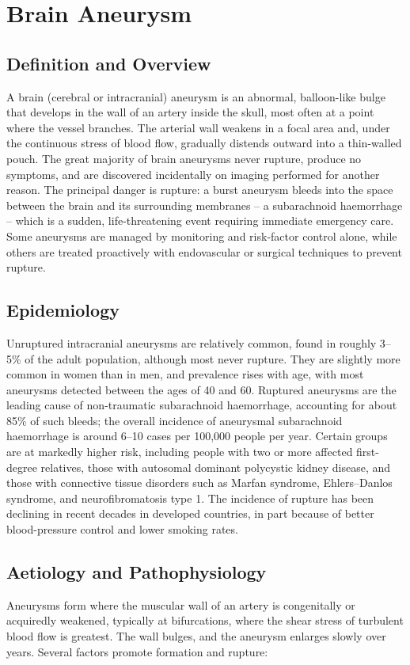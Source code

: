 \chapter{Brain Aneurysm}

\section*{Definition and Overview}
A brain (cerebral or intracranial) aneurysm is an abnormal, balloon-like bulge that develops in the wall of an artery inside the skull, most often at a point where the vessel branches. The arterial wall weakens in a focal area and, under the continuous stress of blood flow, gradually distends outward into a thin-walled pouch. The great majority of brain aneurysms never rupture, produce no symptoms, and are discovered incidentally on imaging performed for another reason. The principal danger is rupture: a burst aneurysm bleeds into the space between the brain and its surrounding membranes -- a subarachnoid haemorrhage -- which is a sudden, life-threatening event requiring immediate emergency care. Some aneurysms are managed by monitoring and risk-factor control alone, while others are treated proactively with endovascular or surgical techniques to prevent rupture.

\section*{Epidemiology}
Unruptured intracranial aneurysms are relatively common, found in roughly 3--5\% of the adult population, although most never rupture. They are slightly more common in women than in men, and prevalence rises with age, with most aneurysms detected between the ages of 40 and 60. Ruptured aneurysms are the leading cause of non-traumatic subarachnoid haemorrhage, accounting for about 85\% of such bleeds; the overall incidence of aneurysmal subarachnoid haemorrhage is around 6--10 cases per 100,000 people per year. Certain groups are at markedly higher risk, including people with two or more affected first-degree relatives, those with autosomal dominant polycystic kidney disease, and those with connective tissue disorders such as Marfan syndrome, Ehlers--Danlos syndrome, and neurofibromatosis type 1. The incidence of rupture has been declining in recent decades in developed countries, in part because of better blood-pressure control and lower smoking rates.

\section*{Aetiology and Pathophysiology}
Aneurysms form where the muscular wall of an artery is congenitally or acquiredly weakened, typically at bifurcations, where the shear stress of turbulent blood flow is greatest. The wall bulges, and the aneurysm enlarges slowly over years. Several factors promote formation and rupture:

